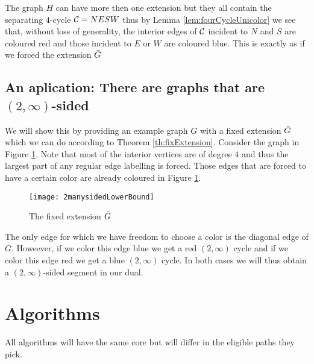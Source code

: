 \documentclass[a4paper]{article}
\theoremstyle{definition}
\begin{document}
The graph $H$ can have more then one extension but they all contain the separating $4$-cycle $\mathcal{C}= NESW$ thus by Lemma \ref{lem:fourCycleUnicolor} we see that, without loss of generality, the interior edges of $\mathcal{C}$ incident to $N$ and $S$ are coloured red and those incident to $E$ or $W$ are coloured blue. This is exactly as if we forced the extension $\bar{G}$

\subsection{An aplication: There are graphs that are $(2, \infty)$-sided}

We will show this by providing an example graph $G$ with a fixed extension $\bar{G}$ which we can do according to Theorem \ref{th:fixExtension}. Consider the graph in Figure \ref{fig:2manysidedLowerBound}. Note that most of the interior vertices are of degree $4$ and thus the largest part of any regular edge labelling is forced. Those edges that are forced to have a certain color are already coloured in Figure \ref{fig:2manysidedLowerBound}.


\begin{figure}[h!]
\centering
\texttt{[image: 2manysidedLowerBound]}

\caption{The fixed extension $\bar{G}$
    \label{fig:2manysidedLowerBound}}
\end{figure}

The only edge for which we have freedom to choose a color is the diagonal edge of $G$. Howeever, if we color this edge blue we get a red $(2, \infty)$ cycle and if we color this edge red we get a blue $(2, \infty)$ cycle. In both cases we will thus obtain a $(2,\infty)$-sided segment in our dual.


\section{Algorithms}
All algorithms will have the same core but will differ in the eligible paths they pick.
\end{document}
